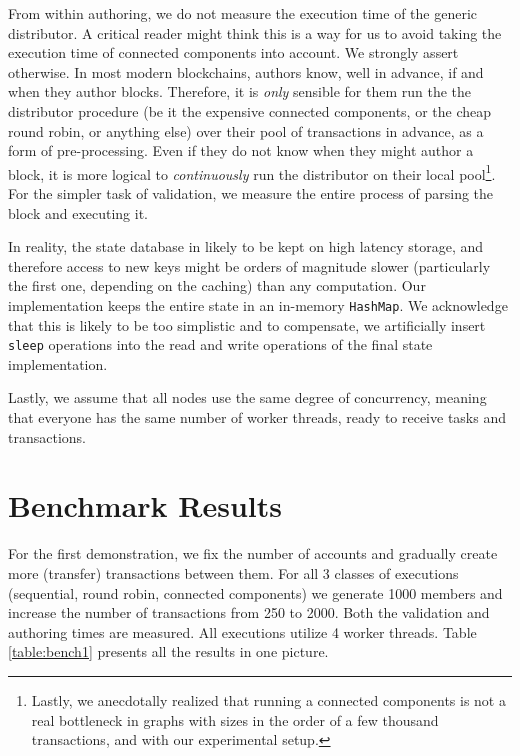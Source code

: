 From within authoring, we do not measure the execution time of the generic distributor. A critical
reader might think this is a way for us to avoid taking the execution time of connected components
into account. We strongly assert otherwise. In most modern blockchains, authors know, well in
advance, if and when they author blocks. Therefore, it is \textit{only} sensible for them run the
the distributor procedure (be it the expensive connected components, or the cheap round robin, or
anything else) over their pool of transactions in advance, as a form of pre-processing. Even if they
do not know when they might author a block, it is more logical to \textit{continuously} run the
distributor on their local pool\footnote{Lastly, we anecdotally realized that running a
connected components is not a real bottleneck in graphs with sizes in the order of a few
thousand transactions, and with our experimental setup.}. For the simpler task of validation, we
measure the entire process of parsing the block and executing it.

In reality, the state database in likely to be kept on high latency storage, and therefore access to
new keys might be orders of magnitude slower (particularly the first one, depending on the caching)
than any computation. Our implementation keeps the entire state in an in-memory \texttt{HashMap}. We
acknowledge that this is likely to be too simplistic and to compensate, we artificially insert
\texttt{sleep} operations into the read and write operations of the final state implementation.

Lastly, we assume that all nodes use the same degree of concurrency, meaning that everyone has the
same number of worker threads, ready to receive tasks and transactions.

\section{Benchmark Results} \label{chap_b&a:sec:results}

For the first demonstration, we fix the number of accounts and gradually create more (transfer)
transactions between them. 
For all 3 classes of executions (sequential, round robin, connected components) we generate 1000 members and increase
the number of transactions from 250 to 2000. Both the validation and authoring times are measured.
All executions utilize 4 worker threads.
Table \ref{table:bench1} presents all the results in one picture. 

